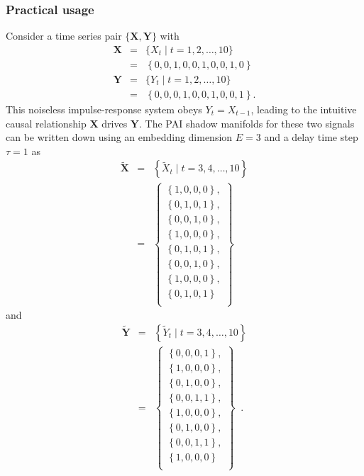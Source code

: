 \documentclass{article}[10pt]
\begin{document}
\subsubsection{Practical usage}
Consider a time series pair $\{\mathbf{X},\mathbf{Y}\}$ with
\begin{eqnarray*}
\mathbf{X} &=& \{X_t\; | \; t=1,2,\ldots,10\}\\
&=& \left\{0,0,1,0,0,1,0,0,1,0\right\}\\
\mathbf{Y} &=& \{Y_t\; | \; t=1,2,\ldots,10\}\\
&=& \left\{0,0,0,1,0,0,1,0,0,1\right\}.
\end{eqnarray*}
This noiseless impulse-response system obeys $Y_t=X_{t-1}$, leading to the intuitive causal relationship $\mathbf{X}$ drives $\mathbf{Y}$.  The PAI shadow manifolds for these two signals can be written down using an embedding dimension $E=3$ and a delay time step $\tau=1$ as
\begin{eqnarray}
\tilde{\mathbf{X}} &=& \left\{\tilde{X}_t\;|\;t=3,4,\ldots,10\right\}\\
&=&\left\{\begin{array}{c} 
\left\{1,0,0,0\right\},\\
\left\{0,1,0,1\right\},\\
\left\{0,0,1,0\right\},\\
\left\{1,0,0,0\right\},\\
\left\{0,1,0,1\right\},\\
\left\{0,0,1,0\right\},\\
\left\{1,0,0,0\right\},\\
\left\{0,1,0,1\right\}\\
\end{array}\right\}
\end{eqnarray}
and
\begin{eqnarray}
\tilde{\mathbf{Y}} &=& \left\{\tilde{Y}_t\;|\;t=3,4,\ldots,10\right\}\\
&=&\left\{\begin{array}{c} 
\left\{0,0,0,1\right\},\\
\left\{1,0,0,0\right\},\\
\left\{0,1,0,0\right\},\\
\left\{0,0,1,1\right\},\\
\left\{1,0,0,0\right\},\\
\left\{0,1,0,0\right\},\\
\left\{0,0,1,1\right\},\\
\left\{1,0,0,0\right\}\\
\end{array}\right\}\;\;.
\end{eqnarray}
\end{document}
